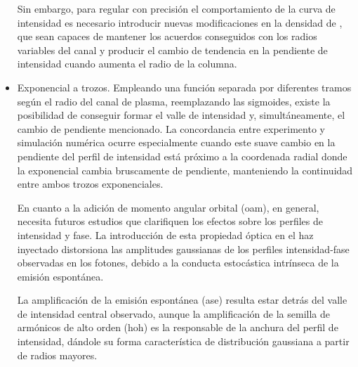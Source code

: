 \begin{itemize}
      Sin embargo, para regular con precisión el comportamiento de la curva de intensidad es necesario introducir nuevas modificaciones en la densidad de , que sean capaces de mantener los acuerdos conseguidos con los radios variables del canal y producir el cambio de tendencia en la pendiente de intensidad cuando aumenta el radio de la columna.
    \item Exponencial a trozos. Empleando una función separada por diferentes tramos según el radio del canal de plasma, reemplazando las sigmoides, existe la posibilidad de conseguir formar el valle de intensidad y, simultáneamente, el cambio de pendiente mencionado. La concordancia entre experimento y simulación numérica ocurre especialmente cuando este suave cambio en la pendiente del perfil de intensidad está próximo a la coordenada radial donde la exponencial cambia bruscamente de pendiente, manteniendo la continuidad entre ambos trozos exponenciales.

      En cuanto a la adición de momento angular orbital (\acrshort{oam}), en general, necesita futuros estudios que clarifiquen los efectos sobre los perfiles de intensidad y fase. La introducción de esta propiedad óptica en el haz inyectado distorsiona las amplitudes gaussianas de los perfiles intensidad-fase observadas en los fotones, debido a la conducta estocástica intrínseca de la emisión espontánea.

      La amplificación de la emisión espontánea (\acrshort{ase}) resulta estar detrás del valle de intensidad central observado, aunque la amplificación de la semilla de armónicos de alto orden (\acrshort{hoh}) es la responsable de la anchura del perfil de intensidad, dándole su forma característica de distribución gaussiana a partir de radios mayores.

\end{itemize}
